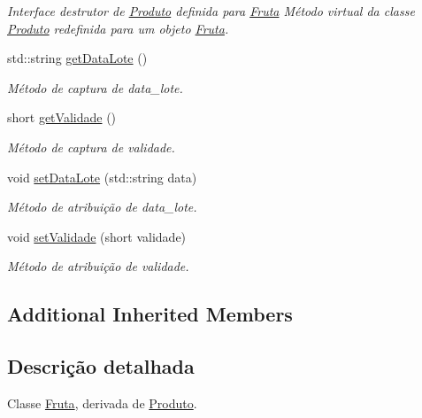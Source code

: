 \begin{DoxyCompactItemize}
\begin{DoxyCompactList}\small\item\em Interface destrutor de \hyperlink{classProduto}{Produto} definida para \hyperlink{classFruta}{Fruta}  Método virtual da classe \hyperlink{classProduto}{Produto} redefinida para um objeto \hyperlink{classFruta}{Fruta}. \end{DoxyCompactList}\item 
std\-::string \hyperlink{classFruta_a89525ef74d892639b1a56dbf1c6ffe61}{get\-Data\-Lote} ()
\begin{DoxyCompactList}\small\item\em Método de captura de data\-\_\-lote. \end{DoxyCompactList}\item 
short \hyperlink{classFruta_ab12db1faf3d5a0743ab461bc3315832e}{get\-Validade} ()
\begin{DoxyCompactList}\small\item\em Método de captura de validade. \end{DoxyCompactList}\item 
void \hyperlink{classFruta_a9aa6275d0da3c9c80430bce35a3d0467}{set\-Data\-Lote} (std\-::string data)
\begin{DoxyCompactList}\small\item\em Método de atribuição de data\-\_\-lote. \end{DoxyCompactList}\item 
void \hyperlink{classFruta_a0ea71bcde4ec328dcfcad0b377848bef}{set\-Validade} (short validade)
\begin{DoxyCompactList}\small\item\em Método de atribuição de validade. \end{DoxyCompactList}\end{DoxyCompactItemize}
\subsection*{Additional Inherited Members}


\subsection{Descrição detalhada}
Classe \hyperlink{classFruta}{Fruta}, derivada de \hyperlink{classProduto}{Produto}. 

